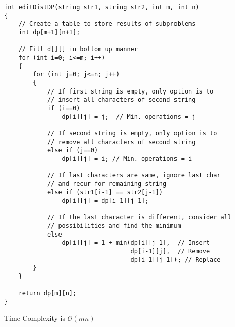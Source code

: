 \documentclass[twoside,12pt,a4paper,english]{book}
\theoremstyle{definition}
\theoremstyle{problemstyle}
\theoremstyle{problemstyle}
\theoremstyle{problemstyle}
\begin{document}
\begin{tcolorbox}[title=Solution]

\begin{lstlisting}
int editDistDP(string str1, string str2, int m, int n)
{
    // Create a table to store results of subproblems
    int dp[m+1][n+1];

    // Fill d[][] in bottom up manner
    for (int i=0; i<=m; i++)
    {
        for (int j=0; j<=n; j++)
        {
            // If first string is empty, only option is to
            // insert all characters of second string
            if (i==0)
                dp[i][j] = j;  // Min. operations = j

            // If second string is empty, only option is to
            // remove all characters of second string
            else if (j==0)
                dp[i][j] = i; // Min. operations = i

            // If last characters are same, ignore last char
            // and recur for remaining string
            else if (str1[i-1] == str2[j-1])
                dp[i][j] = dp[i-1][j-1];

            // If the last character is different, consider all
            // possibilities and find the minimum
            else
                dp[i][j] = 1 + min(dp[i][j-1],  // Insert
                                   dp[i-1][j],  // Remove
                                   dp[i-1][j-1]); // Replace
        }
    }

    return dp[m][n];
}
\end{lstlisting}
Time Complexity is $\mathcal{O}(mn)$
\end{tcolorbox}
\newpage
\end{document}
